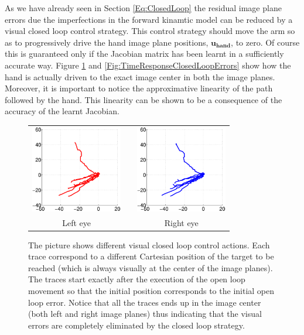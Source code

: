 As we have already seen in Section \ref{Eq:ClosedLoop} the residual image plane errors 
due the imperfections in the forward kinamtic model can be reduced by a visual closed loop
control strategy. This control strategy should move the arm so as to progressively drive the
hand image plane positions, ${\mathbf {u_{hand}}}$, to zero. Of course this is guaranteed 
only if the  Jacobian matrix has been learnt in a sufficiently accurate way. Figure 
\ref{Fig:ImagePlaneClosedLoopErrors} and \ref{Fig:TimeResponseClosedLoopErrors} 
show how the hand is actually driven to the 
exact image center in both the image planes. Moreover, it is important to notice the
approximative linearity of the path followed by the hand. This linearity can be shown
to be a consequence of the accuracy of the learnt Jacobian.

\begin{figure}
  \begin{center}
	\begin{tabular}{ccc}
	  \parbox{40mm}{\includegraphics[width=40mm]{Figure/LeftEyeClosedLoop.eps}}  & \hspace{2cm} &
	  \parbox{40mm}{\includegraphics[width=40mm]{Figure/RightEyeClosedLoop.eps}}
	  \\
	  Left eye & \hspace{2cm} & Right eye
  \end{tabular}
\end{center}
\caption{The picture shows different visual closed loop control actions. Each trace correspond to a different Cartesian position of the target to be reached (which is always visually at the center of the image planes). The traces start exactly after the execution of the open loop movement so that the initial position corresponds to the initial open loop error. Notice that all the traces ends up in the image center (both left and right image planes) thus indicating that the visual errors are completely eliminated by the closed loop strategy.}\label{Fig:ImagePlaneClosedLoopErrors}
  \end{figure}

